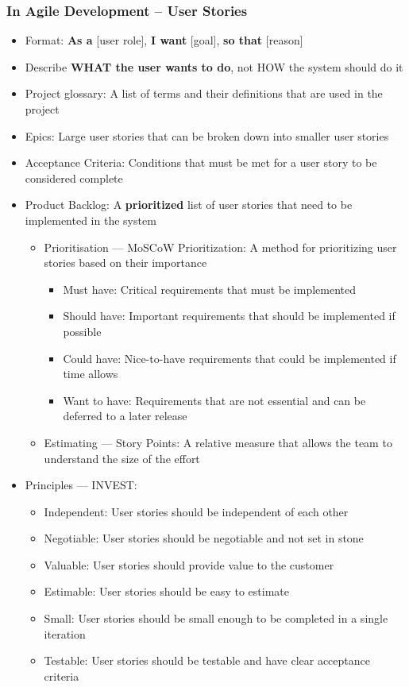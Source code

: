 \documentclass[12pt,openany]{book}
\begin{document}
\subsubsection{In Agile Development -- User Stories}
\begin{itemize}
    \item Format: \textbf{As a} [user role], \textbf{I want} [goal], \textbf{so that} [reason]
    \item Describe \textbf{WHAT the user wants to do}, not HOW the system should do it
    \item Project glossary: A list of terms and their definitions that are used in the project
    \item Epics: Large user stories that can be broken down into smaller user stories
    \item Acceptance Criteria: Conditions that must be met for a user story to be considered complete
    \item Product Backlog: A \textbf{prioritized} list of user stories that need to be implemented in the system
    \begin{itemize}
        \item Prioritisation --- MoSCoW Prioritization: A method for prioritizing user stories based on their importance
        \begin{itemize}
            \item Must have: Critical requirements that must be implemented
            \item Should have: Important requirements that should be implemented if possible
            \item Could have: Nice-to-have requirements that could be implemented if time allows
            \item Want to have: Requirements that are not essential and can be deferred to a later release
        \end{itemize}
        \item Estimating --- Story Points: A relative measure that allows the team to understand the size of the effort
    \end{itemize}
    \item Principles --- INVEST:
    \begin{itemize}
        \item Independent: User stories should be independent of each other
        \item Negotiable: User stories should be negotiable and not set in stone
        \item Valuable: User stories should provide value to the customer
        \item Estimable: User stories should be easy to estimate
        \item Small: User stories should be small enough to be completed in a single iteration
        \item Testable: User stories should be testable and have clear acceptance criteria
    \end{itemize}
\end{itemize}
\end{document}
